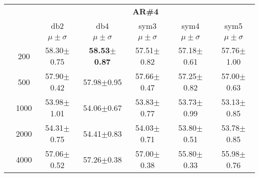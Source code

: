 \begin{table}[H]
\begin{tabular}{|c|c|c c c c c|}
\cline{3-7}
\multicolumn{2}{c|}{\multirow{3}{*}{}} & \multicolumn{5}{c|}{\textbf{AR\#4}}   \\\cline{3-7} 
\multicolumn{2}{c|}{}  & db2 & db4 & sym3 & sym4 & sym5 \\\cline{3-7}%
\multicolumn{2}{c|}{}& $\mu \pm \sigma$ & $\mu \pm \sigma$ & $\mu \pm \sigma$ & $\mu \pm \sigma$ & $\mu \pm \sigma$ \\\hline
\multicolumn{1}{|c|}{ \multirow{5}{*}{\rotatebox[origin=c]{90}{\textbf{Neurônios}}} }
& 200	&58.30$\pm$0.75	&\textbf{58.53$\pm$0.87}	&57.51$\pm$0.82	&57.18$\pm$0.61	&57.76$\pm$1.00	\\\cline{2-7}
& 500	&57.90$\pm$0.42	&57.98$\pm$0.95	&57.66$\pm$0.47	&57.25$\pm$0.82	&57.00$\pm$0.63	\\\cline{2-7}
& 1000	&53.98$\pm$1.01	&54.06$\pm$0.67	&53.83$\pm$0.77	&53.73$\pm$0.99	&53.13$\pm$0.85	\\\cline{2-7}
& 2000	&54.31$\pm$0.75	&54.41$\pm$0.83	&54.03$\pm$0.71	&53.80$\pm$0.51	&53.78$\pm$0.85	\\\cline{2-7}
& 4000	&57.06$\pm$0.52	&57.26$\pm$0.38	&57.00$\pm$0.38	&55.80$\pm$0.33	&55.98$\pm$0.76	

\\\midrule
 \end{tabular}
\end{table}





